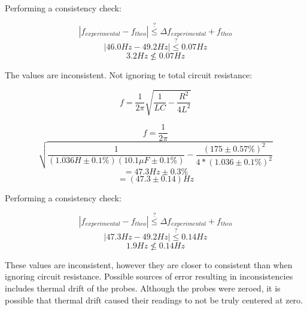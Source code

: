 \documentclass[twocolumn, letterpaper, 10pt, twoside]{article}
\begin{document}
	Performing a consistency check:
	
	\begin{equation*}
	|f_{experimental} - f_{theo}| \stackrel{?}{\leq} \Delta f_{experimental} + f_{theo}
	\end{equation*}
	\begin{equation*}
	|46.0 Hz - 49.2Hz | \stackrel{?}{\leq} 0.07 Hz
	\end{equation*}
	\begin{equation*}
	3.2Hz \nleq 0.07Hz
	\end{equation*}
	
	The values are inconsistent. Not ignoring te total circuit resistance:
 
 	\begin{equation*}
	 f = \frac{1}{2\pi}\sqrt{\frac{1}{LC} - \frac{R^2}{4L^2}}
	\end{equation*}
 	
 	\begin{equation*}
	f = \frac{1}{2\pi}
	\end{equation*}
	\begin{equation*}
	\sqrt{\frac{1}{(1.036H \pm 0.1\%)(10.1\mu F \pm 0.1\%)} -
		\frac{(175 \pm 0.57\%)^2}{4*(1.036 \pm 0.1\%)^2}}
	\end{equation*}
	\begin{equation*}
	= 47.3Hz \pm 0.3\%
	\end{equation*}
	\begin{equation*}
	= (47.3 \pm 0.14)Hz
	\end{equation*}
	
 	Performing a consistency check:
 
	 \begin{equation*}
	 |f_{experimental} - f_{theo}| \stackrel{?}{\leq} \Delta f_{experimental} + f_{theo}
	 \end{equation*}
	 \begin{equation*}
	 |47.3 Hz - 49.2Hz | \stackrel{?}{\leq} 0.14 Hz
	 \end{equation*}
	 \begin{equation*}
	 1.9Hz \nleq 0.14Hz
	 \end{equation*}
 
 	These values are inconsistent, however they are closer to consistent than when ignoring circuit resistance. Possible sources of error resulting in inconsistencies includes thermal drift of the probes. Although the probes were zeroed, it is possible that thermal drift caused their readings to not be truly centered at zero.
 	
\end{document}
